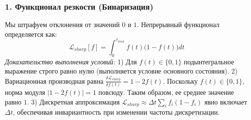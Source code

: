 \documentclass[11pt,a4paper]{article}
\begin{document}
\subsubsection*{1. Функционал резкости (Бинаризация)}
Мы штрафуем отклонения от значений $0$ и $1$. Непрерывный функционал определяется как:
\begin{equation}
\mathcal{L}_{sharp}[f] = \int_{0}^{\tau_{max}} f(t)\big(1 - f(t)\big) dt
\end{equation}
\textit{Доказательство выполнения условий:}
1) Для $f(t) \in \{0, 1\}$ подынтегральное выражение строго равно нулю (выполняется условие основного состояния). 
2) Вариационная производная равна $\frac{\delta \mathcal{L}_{sharp}}{\delta f(t)} = 1 - 2f(t)$. Поскольку $f(t) \in \{0,1\}$, норма модуля $|1-2f(t)| = 1$ повсюду. Таким образом, ее среднее значение равно $1$.
3) Дискретная аппроксимация $\mathcal{L}_{sharp} \approx \Delta t \sum_i f_i(1-f_i)$ явно включает $\Delta t$, обеспечивая инвариантность при изменении частоты дискретизации.
\end{document}
